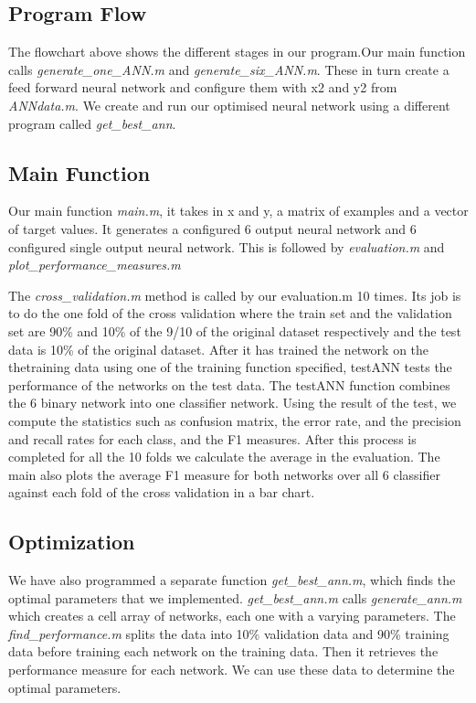 \documentclass[a4wide, 11pt]{article}
\begin{document}
\subsection{Program Flow}
The flowchart above shows the different stages in our program.Our main function calls \textit{generate\_one\_ANN.m} and \textit{generate\_six\_ANN.m}. These in turn create a feed forward neural network and configure them with x2 and y2 from \textit{ANNdata.m}. We create and run our optimised neural network using a different program called \textit{get\_best\_ann}.

\subsection{Main Function}
Our main function \textit{main.m}, it takes in x and y, a matrix of examples and a vector of target values. It generates a configured 6 output neural network and  6 configured single output neural network.  This is followed by \textit{evaluation.m} and \textit{plot\_performance\_measures.m}

The \textit{cross\_validation.m} method is called by our {evaluation.m} 10 times. Its job is to do the one fold of the cross validation where the train set and the validation set are 90\% and 10\% of the 9/10 of the original dataset respectively and the test data is 10\% of the original dataset. After it has trained the network on the thetraining data using one of the training function specified, testANN tests the performance of the networks on the test data. The testANN function combines the 6 binary network into one classifier network. Using the result of the test, we compute the statistics such as confusion matrix, the error rate, and the precision and recall rates for each class, and the F1 measures. After this process is completed for all the 10 folds we calculate the average in the evaluation. The main also plots the average F1 measure for both networks over all 6 classifier against each fold of the cross validation in a bar chart.

\subsection{Optimization}
We have also programmed a separate function \textit{get\_best\_ann.m}, which finds the optimal parameters that we implemented. \textit{get\_best\_ann.m} calls \textit{generate\_ann.m} which creates a cell array of networks, each one with a varying parameters. The \textit{find\_performance.m} splits the data into 10\% validation data and 90\% training data before training each network on the training data. Then it retrieves the performance measure for each network.  We can use these data to determine the optimal parameters.  
\end{document}
